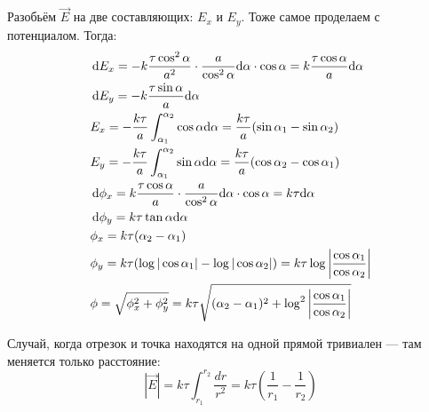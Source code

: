 \documentclass[12pt]{report}
\begin{document}
Разобьём $\vec E$ на две составляющих: $E_x$ и $E_y$. Тоже самое проделаем с потенциалом. Тогда:
\begin{align*}
     & \dd {E_x} = -k \dfrac{\tau \cos^2 \alpha}{a^2} \cdot \dfrac{a}{\cos^2 \alpha} \dd \alpha \cdot \cos{\alpha} = k \dfrac{\tau \cos{\alpha}}{a}\dd \alpha \\
     & \dd {E_y} = -k \dfrac{\tau \sin{\alpha}}{a}\dd \alpha                                                                                                  \\
     & E_x = -\dfrac{k \tau}{a}\int_{\alpha_1}^{\alpha_2} \cos{\alpha}\dd \alpha = \dfrac{k \tau}{a}(\sin{\alpha_1} - \sin{\alpha_2})                         \\
     & E_y = -\dfrac{k \tau}{a}\int_{\alpha_1}^{\alpha_2} \sin{\alpha}\dd \alpha = \dfrac{k \tau}{a}(\cos{\alpha_2} - \cos{\alpha_1})                         \\
     & \dd {\phi_x} = k \dfrac{\tau \cos \alpha}{a} \cdot \dfrac{a}{\cos^2 \alpha} \dd \alpha \cdot \cos{\alpha} = k\tau\dd \alpha                            \\
     & \dd {\phi_y} = k \tau \tan{\alpha}\dd \alpha                                                                                                           \\
     & \phi_x = k\tau(\alpha_2 - \alpha_1)                                                                                                                    \\
     & \phi_y = k\tau(\log|\cos \alpha_1| - \log|\cos \alpha_2|) = k \tau \log\vqty{\dfrac{\cos \alpha_1}{\cos \alpha_2}}                                     \\
     & \phi = \sqrt{\phi_x^2 + \phi_y^2} = k\tau\sqrt{(\alpha_2 - \alpha_1)^2 + \log^2\vqty{\dfrac{\cos \alpha_1}{\cos \alpha_2}}}
\end{align*}

Случай, когда отрезок и точка находятся на одной прямой тривиален --- там меняется только расстояние:
\[
    |\vec{E}| = k\tau \int_{r_1}^{r_2}\dfrac{dr}{r^2} = k\tau\left(\dfrac{1}{r_1} - \dfrac{1}{r_2}\right)
\]
\end{document}
